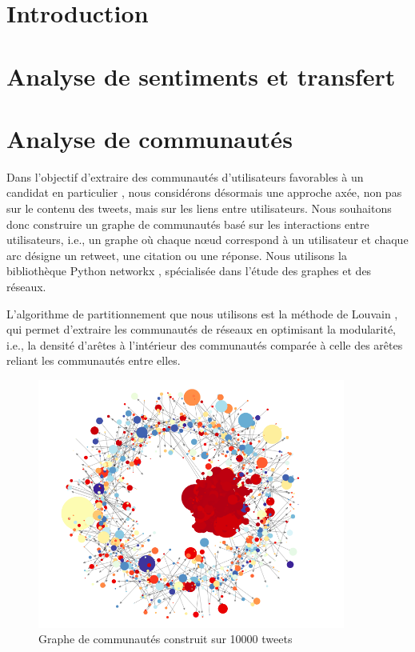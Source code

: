 \documentclass[a4paper]{article}
\begin{document}
\newpage

\section{Introduction}

\newpage

\section{Analyse de sentiments et transfert}

\newpage

\section{Analyse de communautés}

Dans l'objectif d'extraire des communautés d'utilisateurs favorables à un
candidat en particulier , nous considérons désormais une approche axée, non pas
sur le contenu des tweets, mais sur les liens entre utilisateurs. Nous
souhaitons donc construire un graphe de communautés basé sur les interactions
entre utilisateurs, i.e., un graphe où chaque nœud correspond à un utilisateur
et chaque arc désigne un retweet, une citation ou une réponse. Nous utilisons la
bibliothèque Python networkx \cite{networkx}, spécialisée dans l'étude des
graphes et des réseaux.

L'algorithme de partitionnement que nous utilisons est la méthode de Louvain
\cite{blondel-louvain}, qui permet d'extraire les communautés de réseaux en
optimisant la modularité, i.e., la densité d'arêtes à l'intérieur des
communautés comparée à celle des arêtes reliant les communautés entre elles. 

\begin{figure}[H]
	\center 
	\includegraphics[width=0.9\textwidth]{images/analyse_communautes/communautes_total.png}
    \caption{Graphe de communautés construit sur 10000 tweets}
    \label{img:communautes-total}
\end{figure}
\end{document}
